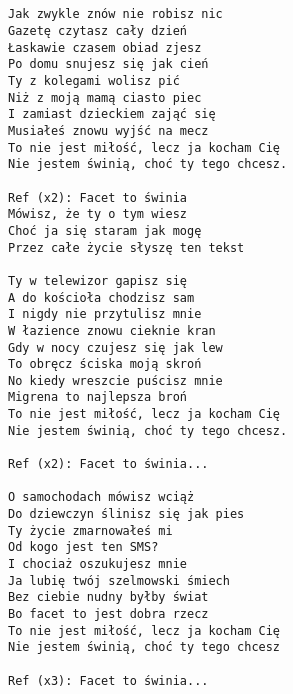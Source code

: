 \documentclass[12pt]{article}
\begin{document}
\subsection*{}
\begin{verbatim}
Jak zwykle znów nie robisz nic
Gazetę czytasz cały dzień
Łaskawie czasem obiad zjesz
Po domu snujesz się jak cień
Ty z kolegami wolisz pić
Niż z moją mamą ciasto piec
I zamiast dzieckiem zająć się
Musiałeś znowu wyjść na mecz
To nie jest miłość, lecz ja kocham Cię
Nie jestem świnią, choć ty tego chcesz.

Ref (x2): Facet to świnia
Mówisz, że ty o tym wiesz
Choć ja się staram jak mogę
Przez całe życie słyszę ten tekst

Ty w telewizor gapisz się
A do kościoła chodzisz sam
I nigdy nie przytulisz mnie
W łazience znowu cieknie kran
Gdy w nocy czujesz się jak lew
To obręcz ściska moją skroń
No kiedy wreszcie puścisz mnie
Migrena to najlepsza broń
To nie jest miłość, lecz ja kocham Cię
Nie jestem świnią, choć ty tego chcesz.

Ref (x2): Facet to świnia...

O samochodach mówisz wciąż
Do dziewczyn ślinisz się jak pies
Ty życie zmarnowałeś mi
Od kogo jest ten SMS?
I chociaż oszukujesz mnie
Ja lubię twój szelmowski śmiech
Bez ciebie nudny byłby świat
Bo facet to jest dobra rzecz
To nie jest miłość, lecz ja kocham Cię
Nie jestem świnią, choć ty tego chcesz

Ref (x3): Facet to świnia...
\end{verbatim}
\clearpage
\end{document}
